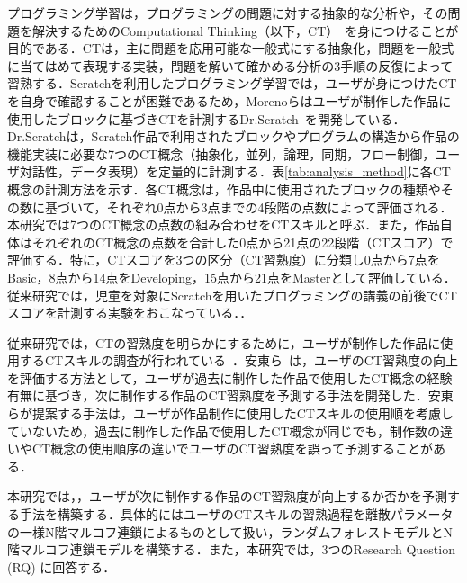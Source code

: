 \documentclass[submit]{ipsj}
\begin{document}
プログラミング学習は，プログラミングの問題に対する抽象的な分析や，その問題を解決するためのComputational Thinking（以下，CT）~\cite{Wing_2006}を身につけることが目的である．CTは，主に問題を応用可能な一般式にする抽象化，問題を一般式に当てはめて表現する実装，問題を解いて確かめる分析の3手順の反復によって習熟する．Scratchを利用したプログラミング学習では，ユーザが身につけたCTを自身で確認することが困難であるため，Morenoらはユーザが制作した作品に使用したブロックに基づきCTを計測するDr.Scratch~\cite{Moreno_2015}を開発している．Dr.Scratchは，Scratch作品で利用されたブロックやプログラムの構造から作品の機能実装に必要な7つのCT概念（抽象化，並列，論理，同期，フロー制御，ユーザ対話性，データ表現）を定量的に計測する．表\ref{tab:analysis_method}に各CT概念の計測方法を示す．各CT概念は，作品中に使用されたブロックの種類やその数に基づいて，それぞれ0点から3点までの4段階の点数によって評価される．本研究では7つのCT概念の点数の組み合わせをCTスキルと呼ぶ．また，作品自体はそれぞれのCT概念の点数を合計した0点から21点の22段階（CTスコア）で評価する．特に，CTスコアを3つの区分（CT習熟度）に分類し\textcolor{red}{}0点から7点をBasic，8点から14点をDeveloping，15点から21点をMasterとして評価している．従来研究では，児童を対象にScratchを用いたプログラミングの講義の前後でCTスコアを計測する実験をおこなっている．\textcolor{red}{}\cite{Moreno_2015}\cite{WiPSCE-Jesus}\cite{IDC2019-Troiano}．


従来研究では，CTの習熟度を明らかにするために，ユーザが制作した作品に使用するCTスキルの調査が行われている~\cite{Yang_2015}\cite{Troiano_2019}．安東ら~\cite{Ando_2021}は，ユーザのCT習熟度の向上を評価する方法として，ユーザが過去に制作した作品で使用したCT概念の経験有無に基づき，次に制作する作品のCT習熟度を予測する手法を開発した．安東らが提案する手法は，ユーザが作品制作に使用したCTスキルの使用順を考慮していないため，過去に制作した作品で使用したCT概念が同じでも，制作数の違いやCT概念の使用順序の違いでユーザのCT習熟度を誤って予測することがある．

本研究では，\textcolor{red}{}，ユーザが次に制作する作品のCT習熟度が向上するか否かを予測する手法を構築する．具体的にはユーザのCTスキルの習熟過程を離散パラメータの一様N階マルコフ連鎖によるものとして扱い，ランダムフォレストモデルとN階マルコフ連鎖モデルを構築する．また，本研究では，3つのResearch Question (RQ) に回答する．
\end{document}
